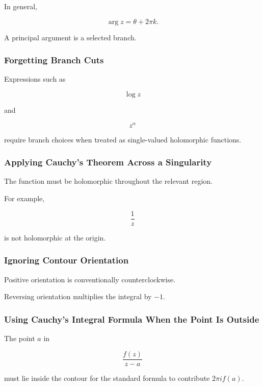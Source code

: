 In general,

\[
\arg z
=
\theta+2\pi k.
\]

A principal argument is a selected branch.

\subsubsection{Forgetting Branch Cuts}

Expressions such as

\[
\log z
\]

and

\[
z^\alpha
\]

require branch choices when treated as single-valued holomorphic
functions.

\subsubsection{Applying Cauchy's Theorem Across a Singularity}

The function must be holomorphic throughout the relevant region.

For example,

\[
\frac1z
\]

is not holomorphic at the origin.

\subsubsection{Ignoring Contour Orientation}

Positive orientation is conventionally counterclockwise.

Reversing orientation multiplies the integral by \(-1\).

\subsubsection{Using Cauchy's Integral Formula When the Point Is Outside}

The point \(a\) in

\[
\frac{f(z)}{z-a}
\]

must lie inside the contour for the standard formula to contribute
\(2\pi i f(a)\).

